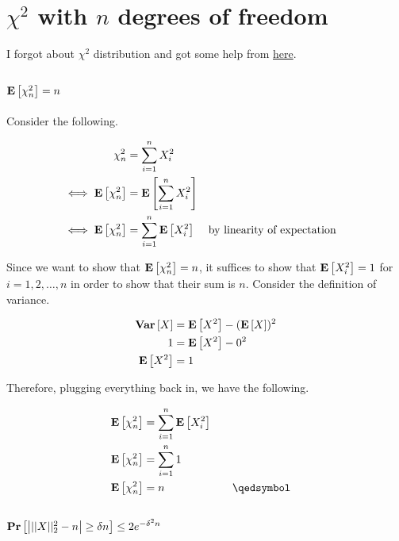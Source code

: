 \chapter{$\chi^2$ with $n$ degrees of freedom}

\begin{tcolorbox}[title=Disclaimer]
	I forgot about $\chi^2$ distribution and got some help from \href{https://online.stat.psu.edu/stat414/book/export/html/784}{here}.
\end{tcolorbox}

\section{$\mathbf{E}\left[\chi_n^2\right] = n$}

Consider the following.

\begin{equation}
\begin{aligned}
	\chi^2_n &= \sum_{i=1}^n X_i^2 \\
	\iff \mathbf{E}\left[\chi^2_n\right] &= \mathbf{E}\left[\sum_{i=1}^n X_i^2\right] \\
	\iff \mathbf{E}\left[\chi^2_n\right] &= \sum_{i=1}^n \mathbf{E}\left[X_i^2\right] && \text{by linearity of expectation}
\end{aligned}
\end{equation}

Since we want to show that $\mathbf{E}\left[\chi^2_n\right] = n$, it suffices to show that $\mathbf{E}\left[X_i^2\right] = 1$ for $i = 1, 2, \ldots, n$ in order to show that their sum is $n$. Consider the definition of variance.

\begin{equation}
\begin{aligned}
	\mathbf{Var}\left[X\right] &= \mathbf{E}\left[X^2\right] - (\mathbf{E}\left[X\right])^2 \\
	1 &= \mathbf{E}\left[X^2\right] - 0^2 \\
	\mathbf{E}\left[X^2\right] &= 1
\end{aligned}
\end{equation}

Therefore, plugging everything back in, we have the following.

\begin{equation}
\begin{aligned}
	\ex{\chi^2_n} &= \sum_{i=1}^n \ex{X_i^2} \\
	\ex{\chi^2_n} &= \sum_{i=1}^n 1 \\
	\ex{\chi^2_n} &= n &&\quad\qedsymbol \\
\end{aligned}
\end{equation}

\section{$\mathbf{Pr}\left[\left|||X||_2^2 - n\right| \geq \delta n\right] \leq 2e^{-\delta^2n}$}
